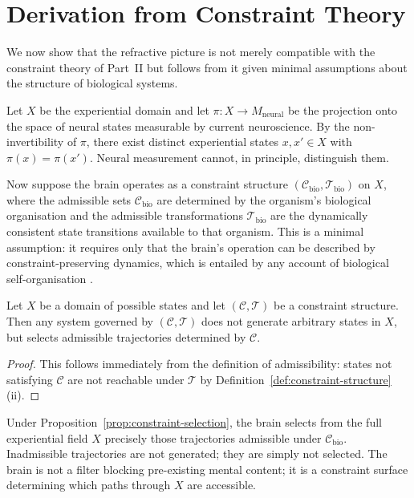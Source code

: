 \documentclass[11pt,openany]{book}
\begin{document}
\section{Derivation from Constraint Theory}
\label{sec:derivation}

We now show that the refractive picture is not merely
compatible with the constraint theory of Part~II but
follows from it given minimal assumptions about the
structure of biological systems.

Let $X$ be the experiential domain and let
$\pi : X \to M_{\mathrm{neural}}$ be the projection onto
the space of neural states measurable by current
neuroscience.  By the non-invertibility of $\pi$, there
exist distinct experiential states $x, x' \in X$ with
$\pi(x) = \pi(x')$.  Neural measurement cannot, in
principle, distinguish them.

Now suppose the brain operates as a constraint structure
$(\mathcal{C}_{\mathrm{bio}}, \mathcal{T}_{\mathrm{bio}})$
on $X$, where the admissible sets
$\mathcal{C}_{\mathrm{bio}}$ are determined by the
organism's biological organisation and the admissible
transformations $\mathcal{T}_{\mathrm{bio}}$ are the
dynamically consistent state transitions available to that
organism.  This is a minimal assumption: it requires only
that the brain's operation can be described by
constraint-preserving dynamics, which is entailed by any
account of biological self-organisation
\citep{varela1991embodied, prigogine1984order}.

\begin{proposition}
\label{prop:constraint-selection}
Let $X$ be a domain of possible states and let
$(\mathcal{C}, \mathcal{T})$ be a constraint structure.
Then any system governed by $(\mathcal{C}, \mathcal{T})$
does not generate arbitrary states in $X$, but selects
admissible trajectories determined by $\mathcal{C}$.
\end{proposition}

\begin{proof}
This follows immediately from the definition of
admissibility: states not satisfying $\mathcal{C}$ are not
reachable under $\mathcal{T}$ by
Definition~\ref{def:constraint-structure}(ii).
\end{proof}

Under Proposition~\ref{prop:constraint-selection}, the brain
selects from the full experiential field $X$ precisely those
trajectories admissible under $\mathcal{C}_{\mathrm{bio}}$.
Inadmissible trajectories are not generated; they are simply
not selected.  The brain is not a filter blocking
pre-existing mental content; it is a constraint surface
determining which paths through $X$ are accessible.
\end{document}
